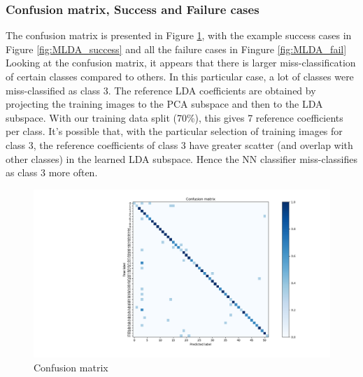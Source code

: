 \documentclass[10pt,technote]{IEEEtran}
\begin{document}
\subsubsection{Confusion matrix, Success and Failure cases}
The confusion matrix is presented in Figure \ref{fig:M_LDA_conf_mat}, with the example success cases in Figure \ref{fig:MLDA_success} and all the failure cases in Fingure \ref{fig:MLDA_fail}
Looking at the confusion matrix, it appears that there is larger miss-classification of certain classes compared to others. In this particular case, a lot of classes were miss-classified as class 3. The reference LDA coefficients are obtained by projecting the training images to the PCA subspace and then to the LDA subspace. With our training data split (70\%), this gives 7 reference coefficients per class. It's possible that, with the particular selection of training images for class 3, the reference coefficients of class 3 have greater scatter (and overlap with other classes) in the learned LDA subspace. Hence the NN classifier miss-classifies as class 3 more often.

\begin{figure}[htb!]
    \centering
    \includegraphics[width = \linewidth]{../results/ex2LDA/LDA_Conf_mat2.png}
    \caption{Confusion matrix}
    \label{fig:M_LDA_conf_mat}
\end{figure}
\end{document}
